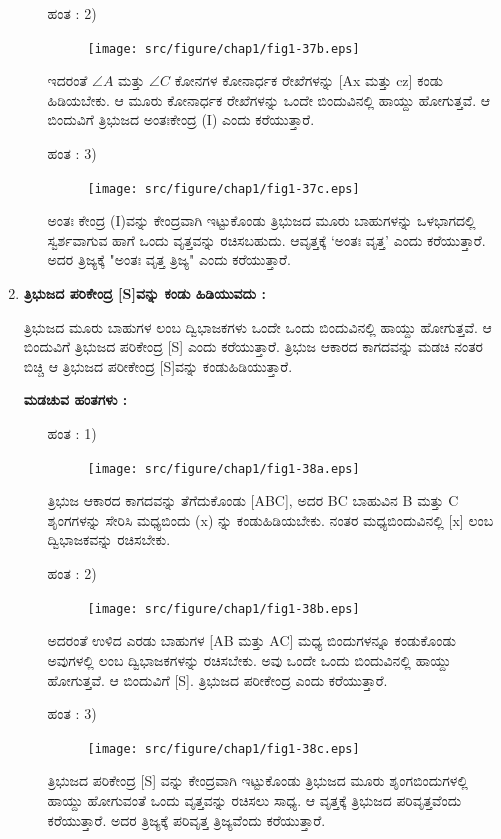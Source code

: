 \begin{enumerate}
\begin{itemize}
 \item[ಹಂತ : 2)] 
 ~
 \begin{figure}[H]
\centering
\texttt{[image: src/figure/chap1/fig1-37b.eps]}
\end{figure}
 
 
 ಇದರಂತೆ  $\angle A$ ಮತ್ತು  $\angle C$ ಕೋನಗಳ ಕೋನಾರ್ಧಕ ರೇಖೆಗಳನ್ನು [Ax ಮತ್ತು  cz] ಕಂಡು ಹಿಡಿಯಬೇಕು. ಆ ಮೂರು ಕೋನಾರ್ಧಕ ರೇಖೆಗಳನ್ನು ಒಂದೇ ಬಿಂದುವಿನಲ್ಲಿ ಹಾಯ್ದು ಹೋಗುತ್ತವೆ. ಆ ಬಿಂದುವಿಗೆ ತ್ರಿಭುಜದ ಅಂತಃಕೇಂದ್ರ  (I) ಎಂದು ಕರೆಯುತ್ತಾರೆ. 
 
  \item[ಹಂತ : 3)] 
 ~
  \begin{figure}[H]
\centering
\texttt{[image: src/figure/chap1/fig1-37c.eps]}
\end{figure}
 
 ಅಂತಃ ಕೇಂದ್ರ (I)ವನ್ನು ಕೇಂದ್ರವಾಗಿ ಇಟ್ಟುಕೊಂಡು ತ್ರಿಭುಜದ ಮೂರು ಬಾಹುಗಳನ್ನು ಒಳಭಾಗದಲ್ಲಿ ಸ್ವರ್ಶವಾಗುವ ಹಾಗೆ ಒಂದು ವೃತ್ತವನ್ನು ರಚಿಸಬಹುದು. ಆವೃತ್ತಕ್ಕೆ  `ಅಂತಃ ವೃತ್ತ' ಎಂದು ಕರೆಯುತ್ತಾರೆ. ಅದರ ತ್ರಿಜ್ಯಕ್ಕೆ "ಅಂತಃ ವೃತ್ತ ತ್ರಿಜ್ಯ" ಎಂದು ಕರೆಯುತ್ತಾರೆ. 
  \end{itemize}
  
  \item \textbf{ತ್ರಿಭುಜದ ಪರಿಕೇಂದ್ರ [S]ವನ್ನು ಕಂಡು ಹಿಡಿಯುವದು :}
  
  ತ್ರಿಭುಜದ ಮೂರು ಬಾಹುಗಳ ಲಂಬ ದ್ವಿಭಾಜಕಗಳು ಒಂದೇ ಒಂದು ಬಿಂದುವಿನಲ್ಲಿ ಹಾಯ್ದು ಹೋಗುತ್ತವೆ. ಆ ಬಿಂದುವಿಗೆ ತ್ರಿಭುಜದ ಪರಿಕೇಂದ್ರ [S] ಎಂದು ಕರೆಯುತ್ತಾರೆ. ತ್ರಿಭುಜ ಆಕಾರದ ಕಾಗದವನ್ನು ಮಡಚಿ ನಂತರ ಬಿಚ್ಚಿ ಆ ತ್ರಿಭುಜದ ಪರೀಕೇಂದ್ರ [S]ವನ್ನು ಕಂಡುಹಿಡಿಯುತ್ತಾರೆ. 
  
    \noindent
 \textbf{ಮಡಚುವ ಹಂತಗಳು :}
  \begin{itemize}
 \item[ಹಂತ : 1)] 
 ~
 \begin{figure}[H]
\centering
\texttt{[image: src/figure/chap1/fig1-38a.eps]}
\end{figure}
  
 
 ತ್ರಿಭುಜ ಆಕಾರದ ಕಾಗದವನ್ನು ತೆಗೆದುಕೊಂಡು [ABC], ಅದರ  BC ಬಾಹುವಿನ  B ಮತ್ತು C ಶೃಂಗಗಳನ್ನು ಸೇರಿಸಿ ಮಧ್ಯಬಿಂದು  (x) ನ್ನು ಕಂಡುಹಿಡಿಯಬೇಕು. ನಂತರ ಮಧ್ಯಬಿಂದುವಿನಲ್ಲಿ [x] ಲಂಬ ದ್ವಿಭಾಜಕವನ್ನು ರಚಿಸಬೇಕು.
 
 
 \item[ಹಂತ : 2)] 
 ~
 \begin{figure}[H]
\centering
\texttt{[image: src/figure/chap1/fig1-38b.eps]}
\end{figure}
 
 
 ಅದರಂತೆ ಉಳಿದ ಎರಡು ಬಾಹುಗಳ [AB ಮತ್ತು  AC] ಮಧ್ಯ ಬಿಂದುಗಳನ್ನೂ ಕಂಡುಕೊಂಡು ಅವುಗಳಲ್ಲಿ ಲಂಬ ದ್ವಿಭಾಜಕಗಳನ್ನು ರಚಿಸಬೇಕು. ಅವು ಒಂದೇ ಒಂದು ಬಿಂದುವಿನಲ್ಲಿ ಹಾಯ್ದು ಹೋಗುತ್ತವೆ. ಆ ಬಿಂದುವಿಗೆ  [S]. ತ್ರಿಭುಜದ ಪರೀಕೇಂದ್ರ ಎಂದು ಕರೆಯುತ್ತಾರೆ. 
 
 
 \item[ಹಂತ : 3)] 
 ~
 \begin{figure}[H]
\centering
\texttt{[image: src/figure/chap1/fig1-38c.eps]}
\end{figure}
   ತ್ರಿಭುಜದ ಪರಿಕೇಂದ್ರ [S] ವನ್ನು ಕೇಂದ್ರವಾಗಿ ಇಟ್ಟುಕೊಂಡು ತ್ರಿಭುಜದ ಮೂರು ಶೃಂಗಬಿಂದುಗಳಲ್ಲಿ ಹಾಯ್ದು ಹೋಗುವಂತೆ ಒಂದು ವೃತ್ತವನ್ನು ರಚಿಸಲು ಸಾಧ್ಯ. ಆ ವೃತ್ತಕ್ಕೆ ತ್ರಿಭುಜದ ಪರಿವೃತ್ತವೆಂದು ಕರೆಯುತ್ತಾರೆ. ಅದರ  ತ್ರಿಜ್ಯಕ್ಕೆ ಪರಿವೃತ್ತ  ತ್ರಿಜ್ಯವೆಂದು ಕರೆಯುತ್ತಾರೆ. 
  \end{itemize}
 \end{enumerate}

